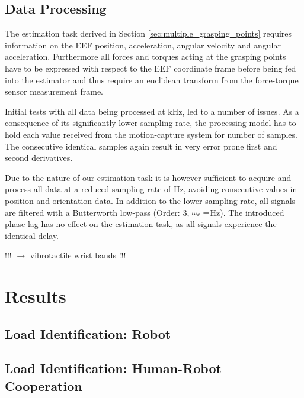 \subsection{Data Processing}
The estimation task derived in Section \ref{sec:multiple_grasping_points} requires information on the EEF position, acceleration, angular velocity and angular acceleration. Furthermore all forces and torques acting at the grasping points have to be expressed with respect to the EEF coordinate frame before being fed into the estimator and thus require an euclidean transform from the force-torque sensor measurement frame.

Initial tests with all data being processed at \unit[1]{kHz}, led to a number of issues. As a consequence of its significantly lower sampling-rate, the processing model has to hold each value received from the motion-capture system for number of samples.  The consecutive identical samples again result in very error prone first
and second derivatives.

Due to the nature of our estimation task it is however sufficient to acquire and process all data at a reduced sampling-rate of \unit[100]{Hz}, avoiding consecutive values in position and orientation data. In addition to the lower sampling-rate, all signals are filtered with a Butterworth low-pass (Order: 3, $\omega_{\mathrm{c}} = $\unit[30]{Hz}). The introduced phase-lag has no effect on the estimation task, as all signals experience the identical delay.

!!! $\longrightarrow$ vibrotactile wrist bands !!!

\section{Results}
\subsection{Load Identification: Robot}
\subsection{Load Identification: Human-Robot Cooperation}

